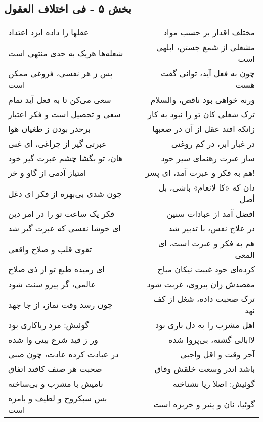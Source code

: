 \begin{center}
\section*{بخش ۵ - فی اختلاف العقول}
\label{sec:005}
\begin{longtable}{l p{0.5cm} r}
عقلها را داده ایزد اعتداد
&&
مختلف اقدار بر حسب مواد
\\
شعله‌ها هریک به حدی منتهی است
&&
مشعلی از شمع جستن، ابلهی است
\\
پس ز هر نفسی، فروغی ممکن است
&&
چون به فعل آید، توانی گفت هست
\\
سعی می‌کن تا به فعل آید تمام
&&
ورنه خواهی بود ناقص، والسلام
\\
سعی و تحصیل است و فکر اعتبار
&&
ترک شغلی کان تو را نبود به کار
\\
برحذر بودن ز طغیان هوا
&&
زانکه افتد عقل از آن در صعبها
\\
عبرتی گیر از چراغی، ای غنی
&&
در غبار ابر، در کم روغنی
\\
هان، تو بگشا چشم عبرت گیر خود
&&
ساز عبرت رهنمای سیر خود
\\
امتیاز آدمی از گاو و خر
&&
هم به فکر و عبرت آمد، ای پسر!
\\
چون شدی بی‌بهره از فکر ای دغل
&&
دان که «کا لانعام» باشی، بل أضل
\\
فکر یک ساعت تو را در امر دین
&&
افضل آمد از عبادات سنین
\\
ای خوشا نفسی که عبرت گیر شد
&&
در علاج نفس، با تدبیر شد
\\
تقوی قلب و صلاح واقعی
&&
هم به فکر و عبرت است، ای المعی
\\
ای رمیده طبع تو از ذی صلاح
&&
کرده‌ای خود غیبت نیکان مباح
\\
عالمی، گر پیرو سنت شود
&&
مقصدش زان پیروی، غربت شود
\\
چون رسد وقت نماز، از جا جهد
&&
ترک صحبت داده، شغل از کف نهد
\\
گوئیش: مرد ریاکاری بود
&&
اهل مشرب را به دل باری بود
\\
ور ز قید شرع بینی وا شده
&&
لاابالی گشته، بی‌پروا شده
\\
در عبادت کرده عادت، چون صبی
&&
آخر وقت و اقل واجبی
\\
صحبت هر صنف کافتد اتفاق
&&
باشد اندر وسعت خلقش وفاق
\\
نامیش با مشرب و بی‌ساخته
&&
گوئیش: اصلا ریا نشناخته
\\
بس سبکروح و لطیف و بامزه است
&&
گوئیا، نان و پنیر و خربزه است
\\
\end{longtable}
\end{center}
